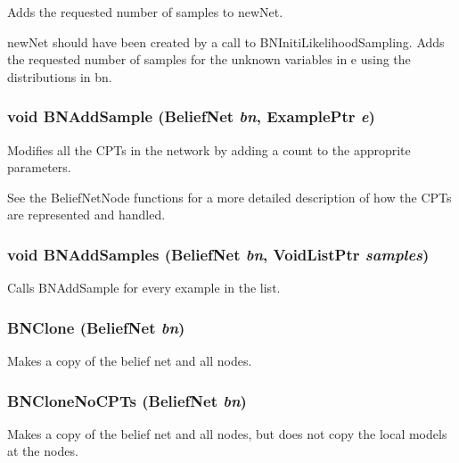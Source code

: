 Adds the requested number of samples to new\-Net. 

new\-Net should have been created by a call to BNIniti\-Likelihood\-Sampling. Adds the requested number of samples for the unknown variables in e using the distributions in bn. 
\subsubsection{\setlength{\rightskip}{0pt plus 5cm}void BNAdd\-Sample ({\bf Belief\-Net} {\em bn}, {\bf Example\-Ptr} {\em e})}\label{BeliefNet_8h_a62}


Modifies all the CPTs in the network by adding a count to the approprite parameters. 

See the Belief\-Net\-Node functions for a more detailed description of how the CPTs are represented and handled. 
\subsubsection{\setlength{\rightskip}{0pt plus 5cm}void BNAdd\-Samples ({\bf Belief\-Net} {\em bn}, {\bf Void\-List\-Ptr} {\em samples})}\label{BeliefNet_8h_a63}


Calls BNAdd\-Sample for every example in the list. 

\subsubsection{ BNClone ({\bf Belief\-Net} {\em bn})}\label{BeliefNet_8h_a47}


Makes a copy of the belief net and all nodes. 

\subsubsection{ BNClone\-No\-CPTs ({\bf Belief\-Net} {\em bn})}\label{BeliefNet_8h_a48}


Makes a copy of the belief net and all nodes, but does not copy the local models at the nodes. 

